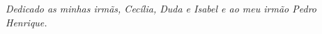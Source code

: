 \documentclass[
	12pt,				%
	openany,			%
	oneside,			%
	a4paper,			%
	english,			%
	brazil,				%
	]{abntex2}
\begin{document}
\pretextual

\imprimircapa


%
% 
% 
% 
%     
%     
% 
%       
%   
% 



\begin{dedicatoria}
 \vspace*{\fill}
 \centering
 \noindent
 \textit{Dedicado as minhas irmãs, Cecília, Duda e Isabel e ao meu irmão Pedro Henrique.} \vspace*{\fill}
\end{dedicatoria}
% 
\end{document}
